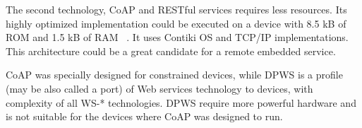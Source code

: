 The second technology, CoAP and RESTful services requires less resources. Its
highly optimized implementation could be executed on a device with 8.5 kB of ROM
and 1.5 kB of RAM ~\cite{6076698}. It uses Contiki OS and TCP/IP
implementations. This architecture could be a great candidate for  a remote
embedded service.

CoAP was specially designed for constrained devices, while DPWS is a profile
(may be also called a port) of Web services technology to devices, with
complexity of all WS-* technologies. DPWS require more powerful hardware and is
not suitable for the devices where CoAP was designed to run.
